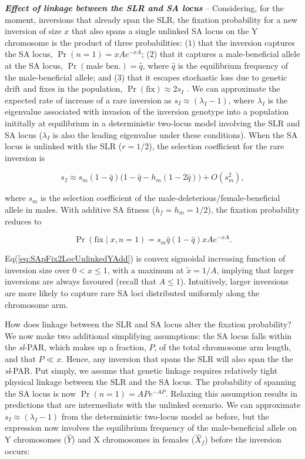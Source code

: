 \documentclass[11pt]{article}
\begin{document}
{\bf \itshape Effect of linkage between the SLR and SA locus} -- Considering, for the moment, inversions that already span the SLR, the fixation probability for a new inversion of size $x$ that also spans a single unlinked SA locus on the Y chromosome is the product of three probabilities: ($1$) that the inversion captures the SA locus, $\Pr(n = 1) = xA e^{-xA}$; ($2$) that it captures a male-beneficial allele at the SA locus, $\Pr(\text{male~ben.}) = \hat{q}$, where $\hat{q}$ is the equilibrium frequency of the male-beneficial allele; and ($3$) that it escapes stochastic loss due to genetic drift and fixes in the population, $\Pr(\text{fix}) \approx 2 s_I$ \cite{Haldane1927}. We can approximate the expected rate of increase of a rare inversion as $s_I \approx (\lambda_I - 1)$, where $\lambda_I$ is the eigenvalue associated with invasion of the inversion genotype into a population inititally at equilibrium in a deterministic two-locus model involving the SLR and SA locus ($\lambda_I$ is also the leading eigenvalue under these conditions). When the SA locus is unlinked with the SLR ($r = 1/2$), the selection coefficient for the rare inversion is

\begin{equation}\label{eq:SApFix2LocUnlinked}
	s_I \approx s_m (1 - \hat{q}) \big( 1 - \hat{q} - h_m(1 - 2\hat{q}) \big) + O(s_{m}^{2}),
\end{equation}

\noindent where $s_m$ is the selection coefficient of the male-deleterious/female-beneficial allele in males. With additive SA fitness ($h_f = h_m = 1/2$), the fixation probability reduces to

\begin{equation}\label{eq:SApFix2LocUnlinkedYAdd}
	\Pr(\text{fix} \mid x,n=1) = s_m \hat{q}(1 - \hat{q}) xA e^{-xA}.
\end{equation}

\noindent Eq(\ref{eq:SApFix2LocUnlinkedYAdd}) is convex sigmoidal increasing function of inversion size over $0 < x \leq 1$, with a maximum at $\tilde{x} = 1/A $, implying that larger inversions are always favoured (recall that $A \leq 1 $). Intuitively, larger inversions are more likely to capture rare SA loci distributed uniformly along the chromosome arm.

How does linkage between the SLR and SA locus alter the fixation probability? We now make two additional simplifying assumptions: the SA locus falls within the {\itshape sl}-PAR, which makes up a fraction, $P$, of the total chromosome arm length, and that $P \ll x$. Hence, any inversion that spans the SLR will also span the the {\itshape sl}-PAR. Put simply, we assume that genetic linkage requires relatively tight physical linkage between the SLR and the SA locus. The probability of spanning the SA locus is now $\Pr(n = 1) = AP e^{-AP}$. Relaxing this assumption results in predictions that are intermediate with the unlinked scenario. We can approximate $s_I \approx (\lambda_I - 1)$ from the deterministic two-locus model as before, but the expression now involves the equilibrium frequency of the male-beneficial allele on Y chromosomes ($\hat{Y}$) and X chromosomes in females ($\hat{X}_f$) before the inversion occurs:
\end{document}
